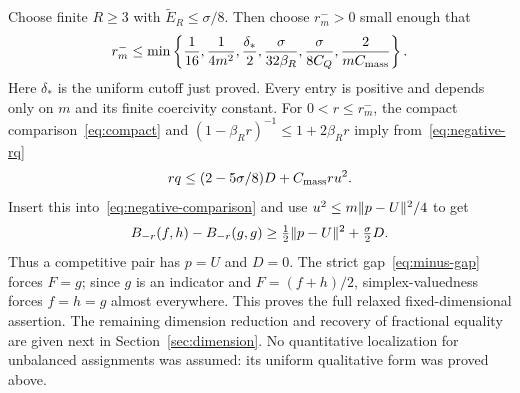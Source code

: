 Choose finite $R\geq3$ with $\widetilde E_R\leq\sigma/8$.
Then choose $r_m^->0$ small enough that
\begin{equation}\label{eq:negative-range}
 r_m^-\leq\min\left\{\frac1{16},\frac1{4m^2},
 \frac{\delta_*}{2},\frac{\sigma}{32\beta_R},
 \frac{\sigma}{8C_Q},\frac{2}{mC_{\rm mass}}\right\}.
\end{equation}
Here $\delta_*$ is the uniform cutoff just proved. Every entry is positive
and depends only on $m$ and its finite coercivity constant.
For $0<r\leq r_m^-$, the compact comparison~\eqref{eq:compact} and
$(1-\beta_Rr)^{-1}\leq1+2\beta_Rr$ imply from~\eqref{eq:negative-rq}
\[
 rq\leq(2-5\sigma/8)D+C_{\rm mass}ru^2.
\]
Insert this into~\eqref{eq:negative-comparison} and use
$u^2\leq m\lVert p-U\rVert^2/4$ to get
\begin{equation}\label{eq:negative-strict}
 B_{-r}(f,h)-B_{-r}(g,g)
 \geq\tfrac12\lVert p-U\rVert^2+\tfrac{\sigma}{2}D.
\end{equation}
Thus a competitive pair has $p=U$ and $D=0$.
The strict gap~\eqref{eq:minus-gap} forces $F=g$; since $g$ is an indicator
and $F=(f+h)/2$, simplex-valuedness forces $f=h=g$ almost everywhere.
This proves the full relaxed fixed-dimensional assertion. The remaining
dimension reduction and recovery of fractional equality are given next in
Section~\ref{sec:dimension}. No quantitative localization for unbalanced
assignments was assumed: its uniform qualitative form was proved above.


